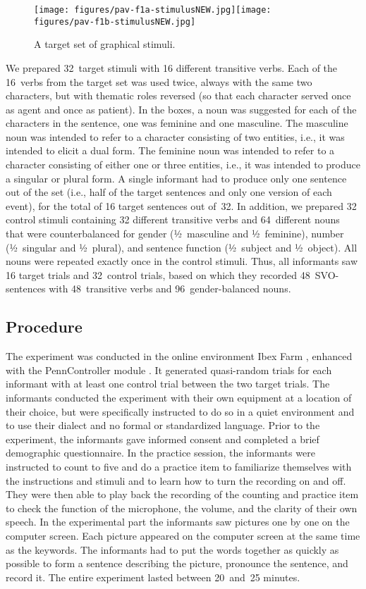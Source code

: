 \documentclass[output=paper,colorlinks,citecolor=brown]{langscibook}
\begin{document}
\begin{figure}
\texttt{[image: figures/pav-f1a-stimulusNEW.jpg]}\texttt{[image: figures/pav-f1b-stimulusNEW.jpg]}
\caption{A target set of graphical stimuli.}
\label{fig:pav:01}
\end{figure}

\noindent We prepared 32~target stimuli with 16 different transitive verbs. Each of the 16~verbs from the target set was used twice, always with the same two  characters, but with thematic roles reversed (so that each character served once as agent and once as patient). In the boxes, a noun was suggested for each of the characters in the sentence, one was feminine and one masculine. The masculine noun was intended to refer to a character consisting of two entities, i.e., it was intended to elicit a dual form. The feminine noun was intended to refer to a character consisting of either one or three entities, i.e., it was intended to produce a singular or plural form. A single informant had to produce only one sentence out of the set (i.e., half of the target sentences and only one version of each event), for the total of 16 target sentences out of~32.
In addition, we prepared 32 control stimuli containing 32 different transitive verbs and 64~different nouns that were counterbalanced for gender (½~masculine and ½~feminine), number (½~singular and ½~plural), and sentence function (½~subject and ½~object). All nouns were repeated exactly once in the control stimuli. 
Thus, all informants saw 16 target trials and 32~control trials, based on which they recorded 48~SVO-sentences with 48~transitive verbs and 96~gender-balanced nouns.

\subsection{Procedure}\label{pav:sec:procedure}
The experiment was conducted in the online environment Ibex Farm \citep{Drummond2021}, enhanced with the PennController module \citep{ZehrSchwarz2018}. It generated quasi-random trials for each informant with at least one control trial between the two target trials. The informants conducted the experiment with their own equipment at a location of their choice, but were specifically instructed to do so in a quiet environment and to use their dialect and no formal or standardized language. Prior to the experiment, the informants gave informed consent and completed a brief demographic questionnaire. In the practice session, the informants were instructed to count to five and do a practice item to familiarize themselves with the instructions and stimuli and to learn how to turn the recording on and off. They were then able to play back the recording of the counting and practice item to check the function of the microphone, the volume, and the clarity of their own speech. In the experimental part the informants saw pictures one by one on the computer screen. Each picture appeared on the computer screen at the same time as the keywords. The informants had to put the words together as quickly as possible to form a sentence describing the picture, pronounce the sentence, and record it. The entire experiment lasted between 20~and~25 minutes.
\end{document}
